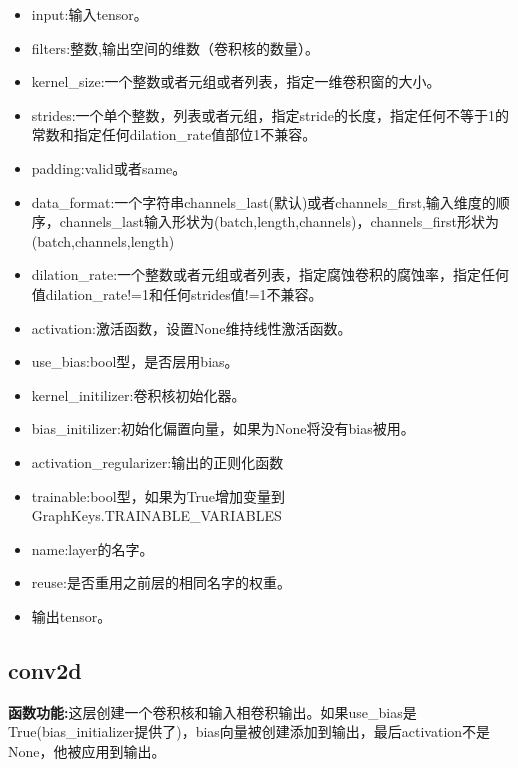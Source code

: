 \begin{itemize}
	\item input:输入tensor。
	\item filters:整数,输出空间的维数（卷积核的数量）。
	\item kernel\_size:一个整数或者元组或者列表，指定一维卷积窗的大小。
	\item strides:一个单个整数，列表或者元组，指定stride的长度，指定任何不等于1的常数和指定任何dilation\_rate值部位1不兼容。
	\item padding:valid或者same。
	\item data\_format:一个字符串channels\_last(默认)或者channels\_first,输入维度的顺序，channels\_last输入形状为(batch,length,channels)，channels\_first形状为(batch,channels,length)
	\item dilation\_rate:一个整数或者元组或者列表，指定腐蚀卷积的腐蚀率，指定任何值dilation\_rate!=1和任何strides值!=1不兼容。
	\item activation:激活函数，设置None维持线性激活函数。
	\item use\_bias:bool型，是否层用bias。
	\item kernel\_initilizer:卷积核初始化器。
	\item bias\_initilizer:初始化偏置向量，如果为None将没有bias被用。
	\item activation\_regularizer:输出的正则化函数
	\item trainable:bool型，如果为True增加变量到GraphKeys.TRAINABLE\_VARIABLES
	\item name:layer的名字。
	\item reuse:是否重用之前层的相同名字的权重。
	\item 输出tensor。
\end{itemize}

\subsection{conv2d}
\textbf{函数功能:}这层创建一个卷积核和输入相卷积输出。如果use\_bias是True(bias\_initializer提供了)，bias向量被创建添加到输出，最后activation不是None，他被应用到输出。

